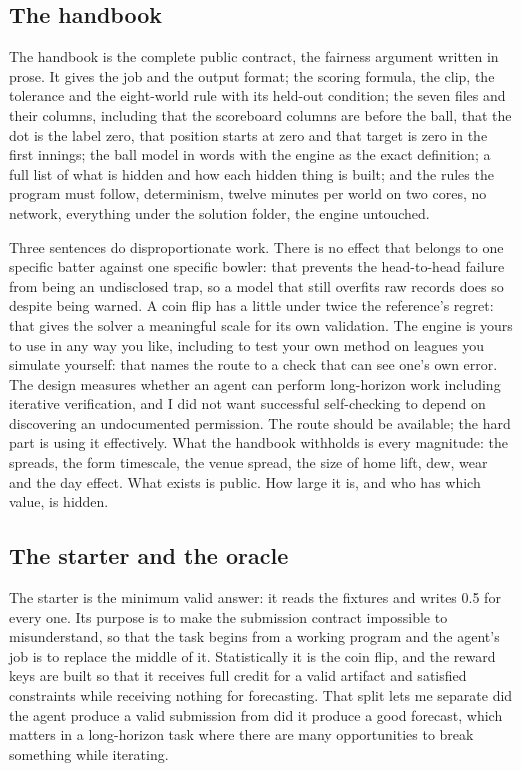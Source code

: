 \documentclass[11pt,letterpaper]{article}
\begin{document}
\subsection{The handbook}

The handbook is the complete public contract, the fairness argument written in prose. It gives the job and the output format; the scoring formula, the clip, the tolerance and the eight-world rule with its held-out condition; the seven files and their columns, including that the scoreboard columns are before the ball, that the dot is the label zero, that position starts at zero and that target is zero in the first innings; the ball model in words with the engine as the exact definition; a full list of what is hidden and how each hidden thing is built; and the rules the program must follow, determinism, twelve minutes per world on two cores, no network, everything under the solution folder, the engine untouched.


Three sentences do disproportionate work. There is no effect that belongs to one specific batter against one specific bowler: that prevents the head-to-head failure from being an undisclosed trap, so a model that still overfits raw records does so despite being warned. A coin flip has a little under twice the reference's regret: that gives the solver a meaningful scale for its own validation. The engine is yours to use in any way you like, including to test your own method on leagues you simulate yourself: that names the route to a check that can see one's own error. The design measures whether an agent can perform long-horizon work including iterative verification, and I did not want successful self-checking to depend on discovering an undocumented permission. The route should be available; the hard part is using it effectively. What the handbook withholds is every magnitude: the spreads, the form timescale, the venue spread, the size of home lift, dew, wear and the day effect. What exists is public. How large it is, and who has which value, is hidden.


\subsection{The starter and the oracle}

The starter is the minimum valid answer: it reads the fixtures and writes 0.5 for every one. Its purpose is to make the submission contract impossible to misunderstand, so that the task begins from a working program and the agent's job is to replace the middle of it. Statistically it is the coin flip, and the reward keys are built so that it receives full credit for a valid artifact and satisfied constraints while receiving nothing for forecasting. That split lets me separate did the agent produce a valid submission from did it produce a good forecast, which matters in a long-horizon task where there are many opportunities to break something while iterating.
\end{document}
